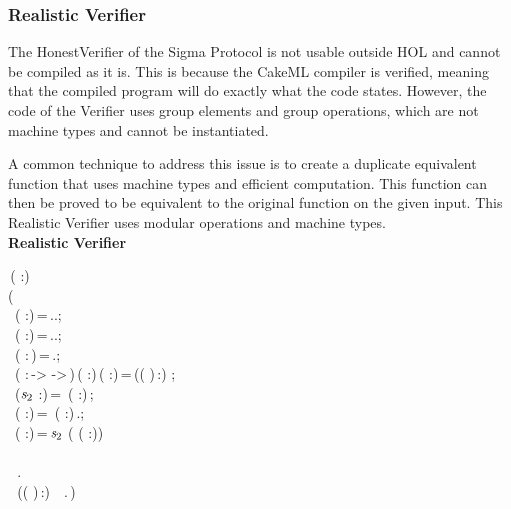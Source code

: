 \subsubsection{Realistic Verifier}
The HonestVerifier of the Sigma Protocol is not usable outside HOL and cannot be 
compiled as it is. This is because the CakeML compiler is verified, meaning that the compiled 
program will do exactly what the code states. However, the code of the Verifier uses group 
elements and group operations, which are not machine types and cannot be instantiated.

A common technique to address this issue is to create a duplicate equivalent function 
that uses machine types and efficient computation. This function can then be proved to 
be equivalent to the original function on the given input. This Realistic Verifier uses 
modular operations and machine types.\\

\textbf{Realistic Verifier}
\begin{holmath}
    \,( :)\,\HOLSymConst{\HOLTokenEquiv{}}\\
(\\
\,\,\,( :)\,=\,..;\\
\,\,\,( :)\,=\,..;\\
\,\,\,( :\,)\,=\,.;\\
\,\,\,( :\,->\,\,->\,)\,( :)\,( :)\,=\,((\,\HOLSymConst{\HOLTokenProd{}}\,)\,:)\,\,;\\
\,\,\,(\ensuremath{\HOLBoundVar{s}\sb{\mathrm{2}}} :)\,=\,\,\,( :)\,;\\
\,\,\,( :)\,=\,\,\,( :)\,.;\\
\,\,\,( :)\,=\,\ensuremath{\HOLBoundVar{s}\sb{\mathrm{2}}}\,\HOLSymConst{\HOLTokenExp{}}\,(\,\HOLSymConst{\ensuremath{-}}\,( :))\,\,\\
\,\\
\,\,\,\,.\,\HOLSymConst{\HOLTokenGeq{}}\,\,\,\\
\,\,\,\,((\,\HOLSymConst{\HOLTokenProd{}}\,)\,:)\,\,\,\HOLSymConst{=}\,\,\,.\,)
\end{holmath}  

